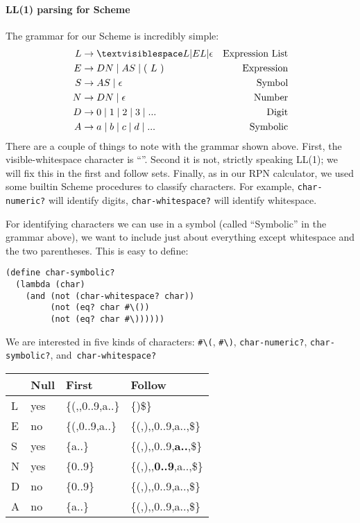 \documentclass[letterpaper,12pt]{article}
\begin{document}
\paragraph{LL(1) parsing for Scheme}

The grammar for our Scheme is incredibly simple:
\begin{align*}
  L &\rightarrow \textvisiblespace L | EL | \epsilon  &\mbox{Expression List}\\
  E &\rightarrow DN \mid AS \mid (\ L\ ) &\mbox{Expression}\\
  S &\rightarrow AS \mid \epsilon &\mbox{Symbol}\\
  N &\rightarrow DN \mid \epsilon &\mbox{Number}\\
  D &\rightarrow 0 \mid 1 \mid 2 \mid 3 \mid ... &\mbox{Digit}\\
  A &\rightarrow a \mid b \mid c \mid d \mid ... &\mbox{Symbolic}\\
\end{align*}
%
There are a couple of things to note with the grammar shown above.  First, the
visible-whitespace character is ``\textvisiblespace''.  Second it is not,
strictly speaking LL(1); we will fix this in the first and follow sets.
Finally, as in our RPN calculator, we used some builtin Scheme procedures to
classify characters.  For example, \texttt{char-numeric?} will identify digits,
\texttt{char-whitespace?} will identify whitespace.

For identifying characters we can use in a symbol (called ``Symbolic'' in the
grammar above), we want to include just about everything except whitespace and
the two parentheses.  This is easy to define:
\begin{Verbatim}[frame=single]
(define char-symbolic?
  (lambda (char)
    (and (not (char-whitespace? char))
         (not (eq? char #\())
         (not (eq? char #\))))))  
\end{Verbatim}
We are interested in five kinds of characters: \verb|#\(|, \verb|#\)|,
\verb|char-numeric?|, \verb|char-symbolic?|, and~\verb|char-whitespace?|


\begin{center}
  \begin{tabular}[t]{l|l|l|l}
    &Null&First&Follow\\\hline
    L&yes&\{(,\textvisiblespace,0..9,a..\}&\{)\$\}\\
    E&no &\{(,0..9,a..\}&\{(,),\textvisiblespace,0..9,a..,\$\}\\
    S&yes&\{a..\}&\{(,),\textvisiblespace,0..9,\textbf{a..},\$\}\\
    N&yes&\{0..9\}&\{(,),\textvisiblespace,\textbf{0..9},a..,\$\}\\
    D&no &\{0..9\}&\{(,),\textvisiblespace,0..9,a..,\$\}\\
    A&no &\{a..\}&\{(,),\textvisiblespace,0..9,a..,\$\}\\
  \end{tabular}
\end{center}
\end{document}
